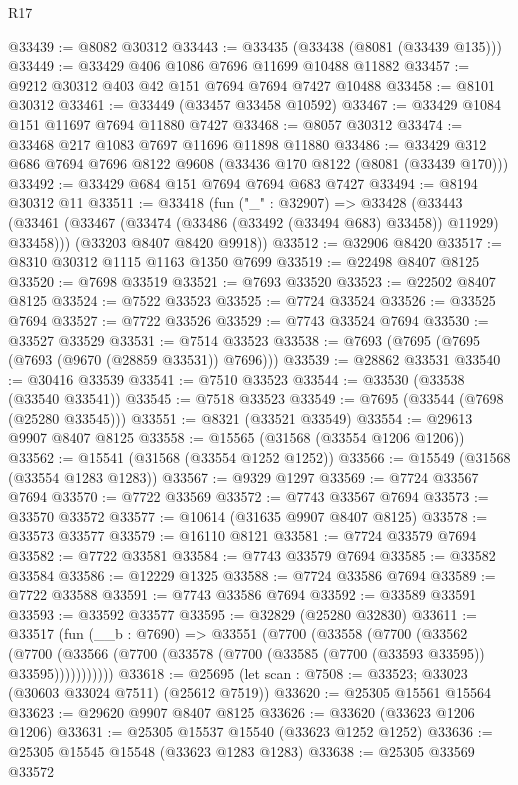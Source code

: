 \begin{lexlean}{R17}
\begin{coremodule}
@33439 := @8082 @30312
@33443 := @33435 (@33438 (@8081 (@33439 @135)))
@33449 := @33429 @406 @1086 @7696 @11699 @10488 @11882
@33457 := @9212 @30312 @403 @42 @151 @7694 @7694 @7427 @10488
@33458 := @8101 @30312
@33461 := @33449 (@33457 @33458 @10592)
@33467 := @33429 @1084 @151 @11697 @7694 @11880 @7427
@33468 := @8057 @30312
@33474 := @33468 @217 @1083 @7697 @11696 @11898 @11880
@33486 := @33429 @312 @686 @7694 @7696 @8122 @9608 (@33436 @170 @8122 (@8081 (@33439 @170)))
@33492 := @33429 @684 @151 @7694 @7694 @683 @7427
@33494 := @8194 @30312 @11
@33511 := @33418
    (fun ("_" : @32907) =>
    @33428
      (@33443 (@33461 (@33467 (@33474 (@33486 (@33492 (@33494 @683) @33458)) @11929) @33458)))
      (@33203 @8407 @8420 @9918))
@33512 := @32906 @8420
@33517 := @8310 @30312 @1115 @1163 @1350 @7699
@33519 := @22498 @8407 @8125
@33520 := @7698 @33519
@33521 := @7693 @33520
@33523 := @22502 @8407 @8125
@33524 := @7522 @33523
@33525 := @7724 @33524
@33526 := @33525 @7694
@33527 := @7722 @33526
@33529 := @7743 @33524 @7694
@33530 := @33527 @33529
@33531 := @7514 @33523
@33538 := @7693 (@7695 (@7695 (@7693 (@9670 (@28859 @33531)) @7696)))
@33539 := @28862 @33531
@33540 := @30416 @33539
@33541 := @7510 @33523
@33544 := @33530 (@33538 (@33540 @33541))
@33545 := @7518 @33523
@33549 := @7695 (@33544 (@7698 (@25280 @33545)))
@33551 := @8321 (@33521 @33549)
@33554 := @29613 @9907 @8407 @8125
@33558 := @15565 (@31568 (@33554 @1206 @1206))
@33562 := @15541 (@31568 (@33554 @1252 @1252))
@33566 := @15549 (@31568 (@33554 @1283 @1283))
@33567 := @9329 @1297
@33569 := @7724 @33567 @7694
@33570 := @7722 @33569
@33572 := @7743 @33567 @7694
@33573 := @33570 @33572
@33577 := @10614 (@31635 @9907 @8407 @8125)
@33578 := @33573 @33577
@33579 := @16110 @8121
@33581 := @7724 @33579 @7694
@33582 := @7722 @33581
@33584 := @7743 @33579 @7694
@33585 := @33582 @33584
@33586 := @12229 @1325
@33588 := @7724 @33586 @7694
@33589 := @7722 @33588
@33591 := @7743 @33586 @7694
@33592 := @33589 @33591
@33593 := @33592 @33577
@33595 := @32829 (@25280 @32830)
@33611 := @33517
    (fun (__b : @7690) =>
    @33551
      (@7700
        (@33558
          (@7700
            (@33562
              (@7700 (@33566 (@7700 (@33578 (@7700 (@33585 (@7700 (@33593 @33595)) @33595)))))))))))
@33618 := @25695 (let scan : @7508 := @33523; @33023 (@30603 @33024 @7511) (@25612 @7519))
@33620 := @25305 @15561 @15564
@33623 := @29620 @9907 @8407 @8125
@33626 := @33620 (@33623 @1206 @1206)
@33631 := @25305 @15537 @15540 (@33623 @1252 @1252)
@33636 := @25305 @15545 @15548 (@33623 @1283 @1283)
@33638 := @25305 @33569 @33572

\end{coremodule}
\end{lexlean}
